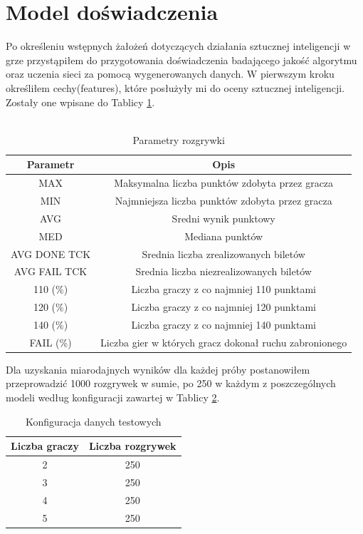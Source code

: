 \documentclass[12pt, oneside]{report}
\begin{document}
	\section{Model doświadczenia}
	Po określeniu wstępnych żałożeń dotyczących działania sztucznej inteligencji w grze przystąpiłem do przygotowania doświadczenia badającego jakość algorytmu oraz uczenia sieci za pomocą wygenerowanych danych. W pierwszym kroku określiłem cechy(features), które posłużyły mi do oceny sztucznej inteligencji. Zostały one wpisane do Tablicy \ref{table:outputparam}. \\ \\
	\begin{table}[h]
		\begin{center}
			\begin{tabular}{| c | c |} \hline
				Parametr  & Opis \\ \hline
				MAX & Maksymalna liczba punktów zdobyta przez gracza \\ \hline
				MIN & Najmniejsza liczba punktów zdobyta przez gracza \\ \hline
				AVG & Sredni wynik punktowy \\ \hline
				MED & Mediana punktów \\ \hline
				AVG DONE TCK & Srednia liczba zrealizowanych biletów \\ \hline
				AVG FAIL TCK & Srednia liczba niezrealizowanych biletów \\ \hline
				110 (\%) & Liczba graczy z co najmniej 110 punktami \\ \hline
				120 (\%) & Liczba graczy z co najmniej 120 punktami \\ \hline
				140 (\%) & Liczba graczy z co najmniej 140 punktami \\ \hline
				FAIL (\%) & Liczba gier w których gracz dokonał ruchu zabronionego \\ \hline
			\end{tabular}
			\caption{Parametry rozgrywki}
			\label{table:outputparam}
		\end{center}
	\end{table}
	Dla uzyskania miarodajnych wyników dla każdej próby postanowiłem przeprowadzić 1000 rozgrywek w sumie, po 250 w każdym z poszczególnych modeli według konfiguracji zawartej w Tablicy \ref{table:gameconfig}. 
	\begin{table}[h]
		\begin{center}
			\begin{tabular}{| c | c |} \hline
				Liczba graczy & Liczba rozgrywek \\ \hline
				2 & 250 \\ \hline
				3 & 250 \\ \hline
				4 & 250 \\ \hline
				5 & 250 \\ \hline
			\end{tabular}
			\caption{Konfiguracja danych testowych}
			\label{table:gameconfig}
		\end{center}
	\end{table}
\end{document}
